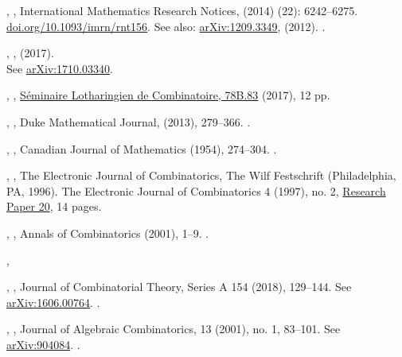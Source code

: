 \documentclass[12pt]{amsart}
\theoremstyle{plain}
\theoremstyle{definition}
\theoremstyle{remark}
\begin{document}
\begin{thebibliography}{10}
,
,
International Mathematics Research Notices, (2014) (22): 6242--6275. 
\href{https://doi.org/10.1093/imrn/rnt156}{doi.org/10.1093/imrn/rnt156}. See also:
\href{http://arxiv.org/abs/1209.3349}{arXiv:1209.3349}, (2012). .

,
, (2017).\\
See \href{https://arxiv.org/pdf/1710.03340}{arXiv:1710.03340}.

,
,
\href{http://www.mat.univie.ac.at/~slc/wpapers/FPSAC2017/83\%20Qiu\%20Remmel.pdf}{S\'eminaire Lotharingien de Combinatoire, 78B.83} (2017), 12 pp.

  
,
,
Duke Mathematical Journal,  (2013), 279--366. .

, 
, 
Canadian Journal of Mathematics  (1954),  274--304. .

,
,
The Electronic Journal of Combinatorics, The Wilf Festschrift (Philadelphia, PA, 1996). The Electronic Journal of Combinatorics 4 (1997), no. 2, \href{http://www.combinatorics.org/ojs/index.php/eljc/article/view/v4i2r20}{Research Paper 20}, 14 pages. 

 ,
 ,
  Annals of Combinatorics (2001), 1--9. .
  
 
 ,
 
  ,
  ,
   Journal of Combinatorial Theory, Series A 154 (2018), 129--144.  
   See \href{http://arxiv.org/abs/1606.00764}{arXiv:1606.00764}. .
  
  ,
  ,
   Journal of Algebraic Combinatorics, 13 (2001), no. 1, 83--101.
   See \href{https://arxiv.org/pdf/math/9904084.pdf}{arXiv:904084}. .

\end{thebibliography}
\end{document}
